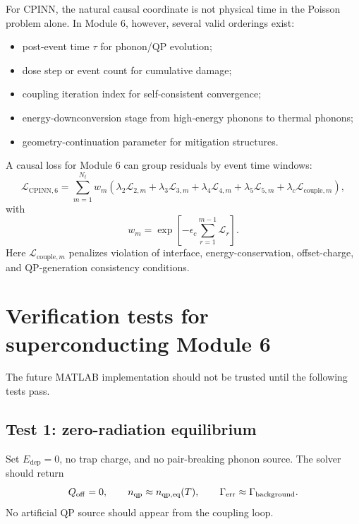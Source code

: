 \documentclass[11pt]{article}
\newcommand{\Edep}{E_{\mathrm{dep}}}
\newcommand{\Qoff}{Q_{\mathrm{off}}}
\newcommand{\nqp}{n_{\mathrm{qp}}}
\newcommand{\Gammaerr}{\Gamma_{\mathrm{err}}}
\begin{document}
For CPINN, the natural causal coordinate is not physical time in the Poisson problem alone. In Module 6, however, several valid orderings exist:
\begin{itemize}[leftmargin=2em]
\item post-event time \(\tau\) for phonon/QP evolution;
\item dose step or event count for cumulative damage;
\item coupling iteration index for self-consistent convergence;
\item energy-downconversion stage from high-energy phonons to thermal phonons;
\item geometry-continuation parameter for mitigation structures.
\end{itemize}
A causal loss for Module 6 can group residuals by event time windows:
\begin{equation}
\mathcal{L}_{\mathrm{CPINN},6}
=\sum_{m=1}^{N_t} w_m
\left(
\lambda_2\mathcal{L}_{2,m}
+\lambda_3\mathcal{L}_{3,m}
+\lambda_4\mathcal{L}_{4,m}
+\lambda_5\mathcal{L}_{5,m}
+\lambda_c\mathcal{L}_{\mathrm{couple},m}
\right),
\end{equation}
with
\begin{equation}
 w_m=\exp\left[-\epsilon_c\sum_{r=1}^{m-1}\mathcal{L}_r\right].
\end{equation}
Here \(\mathcal{L}_{\mathrm{couple},m}\) penalizes violation of interface, energy-conservation, offset-charge, and QP-generation consistency conditions.

\section{Verification tests for superconducting Module 6}

The future MATLAB implementation should not be trusted until the following tests pass.

\subsection{Test 1: zero-radiation equilibrium}

Set \(\Edep=0\), no trap charge, and no pair-breaking phonon source. The solver should return
\begin{equation}
\Qoff=0,
\qquad
\nqp\approx n_{\qp,\mathrm{eq}}(T),
\qquad
\Gammaerr\approx \Gamma_{\mathrm{background}}.
\end{equation}
No artificial QP source should appear from the coupling loop.
\end{document}

